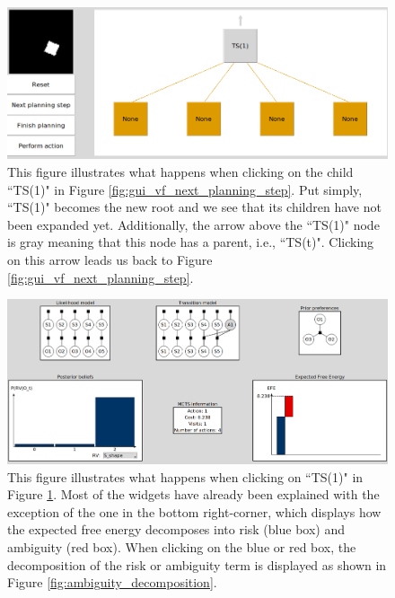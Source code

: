 \documentclass[twoside,11pt]{article}
\begin{document}
\begin{figure}[H]
	\begin{center}
	\includegraphics[scale=0.4]{navigating_to_child_node}
	\end{center}
  \caption{This figure illustrates what happens when clicking on the child ``TS(1)" in Figure \ref{fig:gui_vf_next_planning_step}. Put simply, ``TS(1)" becomes the new root and we see that its children have not been expanded yet. Additionally, the arrow above the ``TS(1)" node is gray meaning that this node has a parent, i.e., ``TS(t)". Clicking on this arrow leads us back to Figure \ref{fig:gui_vf_next_planning_step}.}
   \label{fig:navigating_to_child}
\end{figure}

\begin{figure}[H]
	\begin{center}
	\includegraphics[scale=0.3]{ts_frame_in_the_future.png}
	\end{center}
  \caption{This figure illustrates what happens when clicking on ``TS(1)" in Figure \ref{fig:navigating_to_child}. Most of the widgets have already been explained with the exception of the one in the bottom right-corner, which displays how the expected free energy decomposes into risk (blue box) and ambiguity (red box). When clicking on the blue or red box, the decomposition of the risk or ambiguity term is displayed as shown in Figure \ref{fig:ambiguity_decomposition}.}
   \label{fig:ts_frame_in_the_future}
\end{figure}
\end{document}
